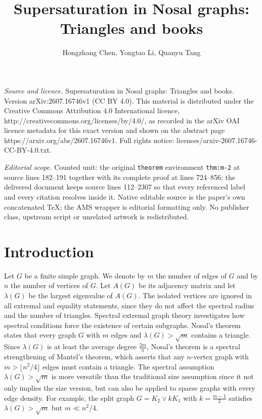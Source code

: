 \documentclass[10pt,a4paper]{amsart}
\begin{document}
\title[Supersaturation in Nosal graphs: Triangles and books]{Supersaturation in Nosal graphs: Triangles and books}
\author{Hongzhang Chen, Yongtao Li, Quanyu Tang}
\date{}
\maketitle
\noindent\emph{Source and licence.} Supersaturation in Nosal graphs: Triangles and books. Version arXiv:2607.16746v1 (CC BY 4.0). This material is distributed under the Creative Commons Attribution 4.0 International licence, http://creativecommons.org/licenses/by/4.0/, as recorded in the arXiv OAI licence metadata for this exact version and shown on the abstract page https://arxiv.org/abs/2607.16746v1. Full rights notice: licenses/arxiv-2607.16746-CC-BY-4.0.txt.\par\smallskip
\noindent\textit{Editorial scope.} Counted unit: the original \texttt{theorem} environment \texttt{thm:m-2} at source lines 182--191 together with its complete proof at lines 724--856; the delivered document keeps source lines 112--2307 so that every referenced label and every citation resolves inside it. Native editable source is the paper's own concatenated TeX; the AMS wrapper is editorial formatting only. No publisher class, upstream script or unrelated artwork is redistributed.
\section{Introduction}

Let $G$ be a finite simple graph. We denote by $m$ the number of edges of $G$ and by $n$ the number of vertices of $G$. 
Let $A(G)$ be its adjacency matrix and let $\lambda(G)$ be the largest eigenvalue of $A(G)$. 
The isolated vertices are ignored in all extremal and equality statements, since they do not affect the spectral radius and the number of triangles. 
Spectral extremal graph theory investigates how spectral conditions force the existence of certain subgraphs. 
Nosal's theorem \cite{Nosal1970} states that every graph $G$ with $m$ edges and $\lambda(G) > \sqrt{m}$ contains a triangle. 
Since $\lambda (G)$ is at least the average degree $\frac{2m}{n}$, 
Nosal's theorem is a spectral strengthening of Mantel's theorem, which asserts that any $n$-vertex graph with $m > \lfloor n^2/4 \rfloor$ edges must contain a triangle. 
The spectral assumption $\lambda (G)> \sqrt{m}$ is more versatile than the traditional size assumption 
since it not only implies the size version, but can also be applied to sparse graphs with every edge density. For example, the split graph $G=K_2\vee kK_1$ with $k=\frac{m-1}{2}$ satisfies $\lambda (G) > \sqrt{m}$ but $m\ll n^2/4$. 
\end{document}
